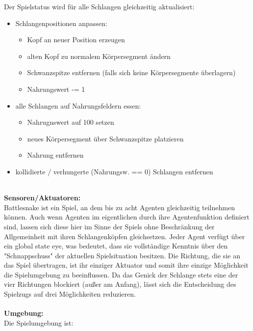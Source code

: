 \documentclass[a4paper,12pt]{article} %
\begin{document}
Der Spielstatus wird für alle Schlangen gleichzeitig aktualisiert:
\begin{itemize}
    \item Schlangenpositionen anpassen: 
    \begin{itemize}
        \item Kopf an neuer Position erzeugen
        \item alten Kopf zu normalem Körpersegment ändern
        \item Schwanzspitze entfernen (falls sich keine Körpersegmente überlagern)
        \item Nahrungswert -= 1
    \end{itemize}
    \item alle Schlangen auf Nahrungsfeldern essen:
    \begin{itemize}
        \item Nahrugnswert auf 100 setzen
        \item neues Körpersegment über Schwanzspitze platzieren
        \item Nahrung entfernen
    \end{itemize}
    \item kollidierte / verhungerte (Nahrungsw. == 0) Schlangen entfernen
\end{itemize}
\\
\textbf{Sensoren/Aktuatoren:}\\
Battlesnake ist ein Spiel, an dem bis zu acht Agenten gleichzeitig teilnehmen können. Auch wenn Agenten im eigentlichen durch ihre Agentenfunktion definiert sind, lassen sich diese hier im Sinne der Spiels ohne Beschränkung der Allgemeinheit mit ihren Schlangenköpfen gleichsetzen. Jeder Agent verfügt über ein global state eye, was bedeutet, dass sie vollständige Kenntnis über den "Schnappschuss" der aktuellen Spielsituation besitzen. Die Richtung, die sie an das Spiel übertragen, ist ihr einziger Aktuator und somit ihre einzige Möglichkeit die Spielumgebung zu beeinflussen. Da das Genick der Schlange stets eine der vier Richtungen blockiert (außer am Anfang), lässt sich die Entscheidung des Spielzugs auf drei Möglichkeiten reduzieren.\\
\\
\textbf{Umgebung:}\\
Die Spielumgebung ist:
\end{document}
